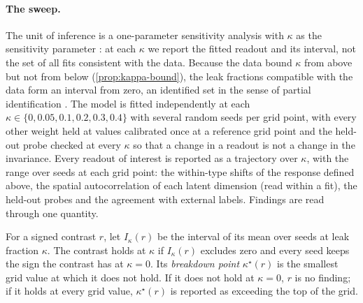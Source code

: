 \paragraph{The sweep.}
 The unit of inference is a one-parameter sensitivity analysis with $\kappa$ as the sensitivity parameter \citep{rosenbaum2002}: at each $\kappa$ we report the fitted readout and its interval, not the set of all fits consistent with the data. Because the data bound $\kappa$ from above but not from below (\cref{prop:kappa-bound}), the leak fractions compatible with the data form an interval from zero, an identified set in the sense of partial identification \citep{manski2003}. The model is fitted independently at each $\kappa \in \{0, 0.05, 0.1, 0.2, 0.3, 0.4\}$ with several random seeds per grid point, with every other weight held at values calibrated once at a reference grid point and the held-out probe checked at every $\kappa$ so that a change in a readout is not a change in the invariance. Every readout of interest is reported as a trajectory over $\kappa$, with the range over seeds at each grid point: the within-type shifts of the response defined above, the spatial autocorrelation of each latent dimension (read within a fit), the held-out probes and the agreement with external labels. Findings are read through one quantity.
\begin{definition}\label{def:breakdown}
For a signed contrast $r$, let $I_\kappa(r)$ be the interval of its mean over seeds at leak fraction $\kappa$. The contrast holds at $\kappa$ if $I_\kappa(r)$ excludes zero and every seed keeps the sign the contrast has at $\kappa = 0$. Its \emph{breakdown point} $\kappa^\star(r)$ is the smallest grid value at which it does not hold. If it does not hold at $\kappa = 0$, $r$ is no finding; if it holds at every grid value, $\kappa^\star(r)$ is reported as exceeding the top of the grid.
\end{definition}
